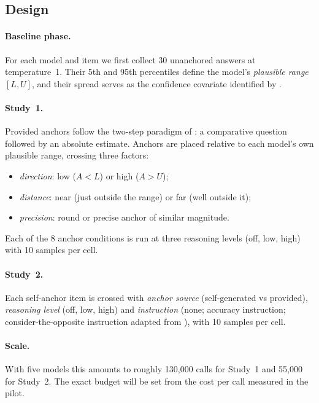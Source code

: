 \documentclass[11pt,a4paper]{article}
\begin{document}
\subsection{Design}

\paragraph{Baseline phase.} For each model and item we first collect 30 unanchored answers at temperature~1. Their 5th and 95th percentiles define the model's \emph{plausible range} $[L, U]$, and their spread serves as the confidence covariate identified by \citet{owusu2026anchoring}.

\paragraph{Study~1.} Provided anchors follow the two-step paradigm of \citet{jacowitz1995measures}: a comparative question followed by an absolute estimate. Anchors are placed relative to each model's own plausible range, crossing three factors:
\begin{itemize}
  \item \emph{direction}: low ($A < L$) or high ($A > U$);
  \item \emph{distance}: near (just outside the range) or far (well outside it);
  \item \emph{precision}: round or precise anchor of similar magnitude.
\end{itemize}
Each of the 8 anchor conditions is run at three reasoning levels (off, low, high) with 10 samples per cell.

\paragraph{Study~2.} Each self-anchor item is crossed with \emph{anchor source} (self-generated vs provided), \emph{reasoning level} (off, low, high) and \emph{instruction} (none; accuracy instruction; consider-the-opposite instruction adapted from \citealp{mussweiler2000overcoming}), with 10 samples per cell.

\paragraph{Scale.} With five models this amounts to roughly 130{,}000 calls for Study~1 and 55{,}000 for Study~2. The exact budget will be set from the cost per call measured in the pilot.
\end{document}
